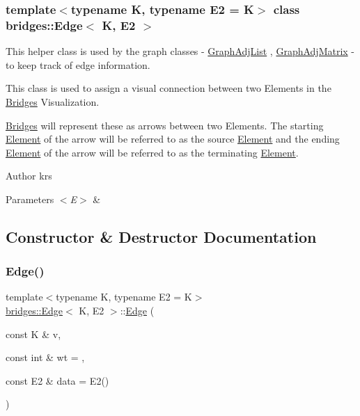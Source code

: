 \subsubsection*{template$<$typename K, typename E2 = K$>$\newline
class bridges\+::\+Edge$<$ K, E2 $>$}

This helper class is used by the graph classes -\/ \mbox{\hyperlink{classbridges_1_1_graph_adj_list}{Graph\+Adj\+List}} , \mbox{\hyperlink{classbridges_1_1_graph_adj_matrix}{Graph\+Adj\+Matrix}} -\/ to keep track of edge information. 

This class is used to assign a visual connection between two Elements in the \mbox{\hyperlink{namespacebridges_1_1_bridges}{Bridges}} Visualization. 

\mbox{\hyperlink{namespacebridges_1_1_bridges}{Bridges}} will represent these as arrows between two Elements. The starting \mbox{\hyperlink{classbridges_1_1_element}{Element}} of the arrow will be referred to as the source \mbox{\hyperlink{classbridges_1_1_element}{Element}} and the ending \mbox{\hyperlink{classbridges_1_1_element}{Element}} of the arrow will be referred to as the terminating \mbox{\hyperlink{classbridges_1_1_element}{Element}}.

\begin{DoxyAuthor}{Author}
krs
\end{DoxyAuthor}

\begin{DoxyParams}{Parameters}
{\em $<$\+E$>$} & \\
\hline
\end{DoxyParams}


\subsection{Constructor \& Destructor Documentation}
\mbox{\label{classbridges_1_1_edge_a8a3fc4ec8164fcff2a7fc057d29db8c7}} 
\subsubsection{\texorpdfstring{Edge()}{Edge()}}
{\footnotesize\ttfamily template$<$typename K, typename E2 = K$>$ \\
\mbox{\hyperlink{classbridges_1_1_edge}{bridges\+::\+Edge}}$<$ K, E2 $>$\+::\mbox{\hyperlink{classbridges_1_1_edge}{Edge}} (\begin{DoxyParamCaption}\item[{const K \&}]{v,  }\item[{const int \&}]{wt = {},  }\item[{const E2 \&}]{data = {\ttfamily E2()} }\end{DoxyParamCaption})\hspace{0.3cm}{\ttfamily [inline]}}

